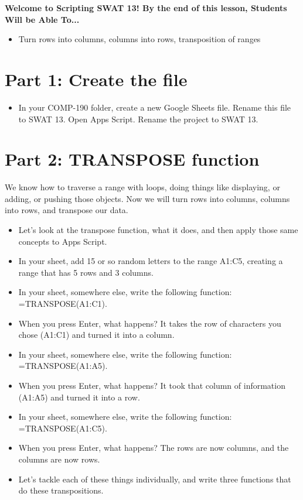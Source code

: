 \documentclass{article}
\newcommand{\AName}{Scripting SWAT 13}
\begin{document}
\textbf{Welcome to \AName!  By the end of this lesson, Students Will be Able To...}
\begin{itemize}
    \item Turn rows into columns, columns into rows, transposition of ranges
\end{itemize}

\section*{Part 1: Create the file}
\begin{itemize}
	\item In your COMP-190 folder, create a new Google Sheets file.  Rename this file to SWAT 13.  Open Apps Script.  Rename the project to SWAT 13.
\end{itemize}

\section*{Part 2: TRANSPOSE function}
We know how to traverse a range with loops, doing things like displaying, or adding, or pushing those objects.  Now we will turn rows into columns, columns into rows, and transpose our data.
\begin{itemize}
	\item Let's look at the transpose function, what it does, and then apply those same concepts to Apps Script.
    \item In your sheet, add 15 or so random letters to the range A1:C5, creating a range that has 5 rows and 3 columns.
    \item In your sheet, somewhere else, write the following function:  =TRANSPOSE(A1:C1).
    \item When you press Enter, what happens?  It takes the row of characters you chose (A1:C1) and turned it into a column.
    \item In your sheet, somewhere else, write the following function:  =TRANSPOSE(A1:A5).
    \item When you press Enter, what happens?  It took that column of information (A1:A5) and turned it into a row.
    \item In your sheet, somewhere else, write the following function:  =TRANSPOSE(A1:C5).
    \item When you press Enter, what happens?  The rows are now columns, and the columns are now rows.
    \item Let's tackle each of these things individually, and write three functions that do these transpositions.
\end{itemize}
\end{document}
